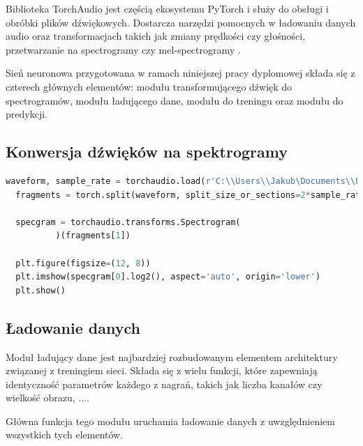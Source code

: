 \documentclass{sprz}
\begin{document}
Biblioteka TorchAudio jest częścią ekosystemu PyTorch i służy do obsługi i obróbki plików dźwiękowych. Dostarcza narzędzi pomocnych w ładowaniu danych audio oraz transformacjach takich jak zmiany prędkości czy głośności, przetwarzanie na spectrogramy czy mel-spectrogramy \cite{torchaudio}. 

Sień neuronowa przygotowana w ramach niniejszej pracy dyplomowej składa się z czterech głównych elementów: modułu transformującego dźwięk do spectrogramów, modułu ładującego dane, modułu do treningu oraz modułu do predykcji.

\subsection{Konwersja dźwięków na spektrogramy}

\begin{lstlisting}[language=Python,caption={Implementacja konwersji dźwięku na spektrogram}, label={lst:audio-to-spectrogram}]
  waveform, sample_rate = torchaudio.load(r'C:\\Users\\Jakub\Documents\\PJATK\\INZ\Batmonit_model\\Chiro_sounds_signed\Audio\\PIPNAT\S4U08639_20210731_234142_PIPNAT.wav')
  fragments = torch.split(waveform, split_size_or_sections=2*sample_rate, dim=1)
  
  specgram = torchaudio.transforms.Spectrogram(
          )(fragments[1])
  
  plt.figure(figsize=(12, 8))
  plt.imshow(specgram[0].log2(), aspect='auto', origin='lower')
  plt.show()
\end{lstlisting}


\subsection{Ładowanie danych}

Moduł ładujący dane jest najbardziej rozbudowanym elementem architektury związanej z treningiem sieci. Składa się z wielu funkcji, które zapewniają identyczność parametrów każdego z nagrań, takich jak liczba kanałów czy wielkość obrazu, ....

Główna funkcja tego modułu uruchamia ładowanie danych z uwzględnieniem wszystkich tych elementów.
\end{document}
